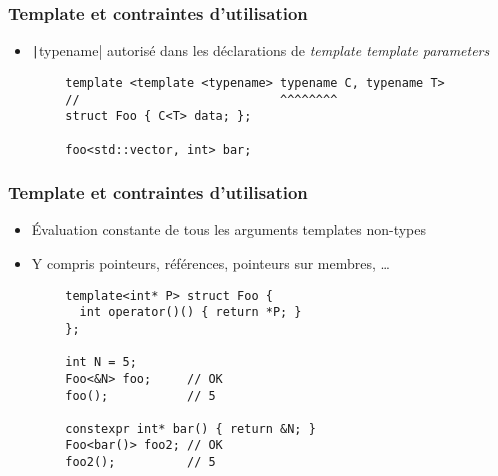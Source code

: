 \documentclass[C++.tex]{subfiles}
\begin{document}
\begin{frame}[fragile]
	\frametitle{Template et contraintes d'utilisation}
	\begin{itemize}
		\item \texttt|typename| autorisé dans les déclarations de \textit{template template parameters}
	\end{itemize}

	\begin{verbatim}
		template <template <typename> typename C, typename T>
		//                            ^^^^^^^^
		struct Foo { C<T> data; };

		foo<std::vector, int> bar;
	\end{verbatim}

\end{frame}

\begin{frame}[fragile]
	\frametitle{Template et contraintes d'utilisation}
	\begin{itemize}
		\item Évaluation constante de tous les arguments templates \og non-types\fg{}
		\item Y compris pointeurs, références, pointeurs sur membres, \ldots{}
	\end{itemize}

	\begin{verbatim}
		template<int* P> struct Foo { 
		  int operator()() { return *P; }
		};

		int N = 5;
		Foo<&N> foo;     // OK
		foo();           // 5

		constexpr int* bar() { return &N; }
		Foo<bar()> foo2; // OK
		foo2();          // 5
	\end{verbatim}
\end{frame}
\end{document}
